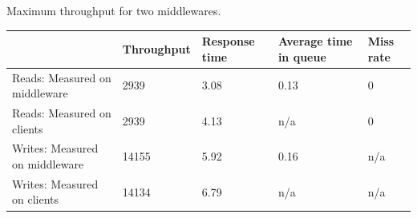 \documentclass[11pt,a4paper]{article}
\begin{document}
\begin{center}
	{Maximum throughput for two middlewares.}
	\begin{tabular}{|l|p{2cm}|p{2cm}|p{2cm}|p{2cm}|}
		\hline                                & Throughput & Response time & Average time in queue & Miss rate \\ 
		\hline Reads: Measured on middleware  & 2939       & 3.08          & 0.13                  & 0          \\ 
		\hline Reads: Measured on clients     & 2939       & 4.13          & n/a                   & 0          \\ 
		\hline Writes: Measured on middleware & 14155      & 5.92          & 0.16                  & n/a       \\ 
		\hline Writes: Measured on clients    & 14134      & 6.79          & n/a                   & n/a       \\ 
		\hline 
	\end{tabular}
\end{center}
\end{document}

